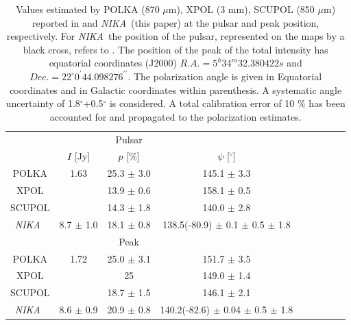 \documentclass[twocolumn,traditabstract]{aa}
\def\NIKA{\textit{NIKA}}
\begin{document}
\begin{table}
  \centering
      \begin{tabular}{ccccccccc}
      \hline
      \hline
      & & \small Pulsar & & \\
       & \small $I$ [Jy]& \small $p$ [\%] & \small $\psi$ [$^\circ$] & \\ 
       \hline
      \small POLKA & \small 1.63 & \small 25.3 $\pm$ \small 3.0 & \small 145.1 $\pm$ \small 3.3 & \\
      \small XPOL  &  & \small 13.9 $\pm$ \small 0.6 & \small 158.1 $\pm$ \small 0.5 &  \\
      \small SCUPOL & & \small 14.3 $\pm$ \small 1.8 & \small 140.0 $\pm$ \small 2.8& \\
 \small \NIKA\ & \small 8.7 $\pm$ \small 1.0 & \small 18.1 $\pm$ \small 0.8 & \small 138.5(-80.9) $\pm$ \small 0.1 $\pm$ \small 0.5 $\pm$ \small 1.8\\
      \hline
      \hline
       & &  \small Peak & & \\
       \hline
      \small POLKA & \small 1.72 & \small 25.0 $\pm$ \small 3.1 & \small 151.7 $\pm$ \small 3.5 &  \\
      \small XPOL  & & \small 25 & \small 149.0 $\pm $ \small 1.4 &  \\
      \small SCUPOL & & \small 18.7 $\pm$ 1.5 & \small 146.1 $\pm$ \small 2.1&\\
  \small \NIKA\ & \small 8.6 $\pm$ \small 0.9 & \small 20.9 $\pm$ \small 0.8 & \small 140.2(-82.6) $\pm$ \small 0.04 $\pm$ \small 0.5 $\pm$ \small 1.8\\
     \hline            
    \hline   
    \end{tabular}
   \caption{ Values estimated by POLKA (870 $\mu$m), XPOL (3 mm), SCUPOL (850 $\mu$m) reported in \cite{2014PASP..126.1027W} and \NIKA\ (this paper) at the pulsar and peak position, respectively. For \NIKA\ the position of the pulsar, represented on the maps by a black cross, refers to \cite{Lobanov}. The position of the peak of the total intensity has equatorial coordinates (J2000) $R.A. =5^h34^m32.380422s$ and $Dec. = 22^{\circ}0^{\prime}44.098276^{\prime\prime}$. The polarization angle is given in Equatorial coordinates and in Galactic coordinates within parenthesis. A systematic angle uncertainty of 1.8$^{\circ}$+0.5$^{\circ}$ is considered. A total calibration error of 10 $\%$ has been accounted for and propagated to the polarization estimates.}
\label{tab:peak_pulsar_others}
 \end{table}
\end{document}
